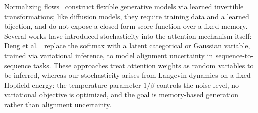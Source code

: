 Normalizing flows~\cite{rezendeMohamed2015} construct flexible generative models via learned invertible transformations; like diffusion models, they require training data and a learned bijection, and do not expose a closed-form score function over a fixed memory. Several works have introduced stochasticity into the attention mechanism itself: Deng et al.~\cite{dengLatentAlignment2018} replace the softmax with a latent categorical or Gaussian variable, trained via variational inference, to model alignment uncertainty in sequence-to-sequence tasks. These approaches treat attention weights as random variables to be inferred, whereas our stochasticity arises from Langevin dynamics on a fixed Hopfield energy: the temperature parameter $1/\beta$ controls the noise level, no variational objective is optimized, and the goal is memory-based generation rather than alignment uncertainty.